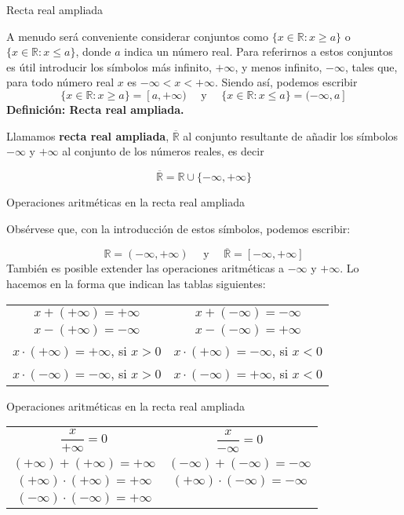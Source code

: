\documentclass[ignorenonframetext,]{beamer}
\begin{document}
\begin{frame}{Recta real ampliada}
\protect\hypertarget{recta-real-ampliada}{}

A menudo será conveniente considerar conjuntos como
\(\{ x \in \mathbb{R}: x \geq a \}\) o
\(\{x \in \mathbb{R}: x \leq a \}\), donde \(a\) indica un número real.
Para referirnos a estos conjuntos es útil introducir los símbolos más
infinito, \(+ \infty\), y menos infinito, \(- \infty\), tales que, para
todo número real \(x\) es \(-\infty < x < +\infty\). Siendo así, podemos
escribir \[
\{ x \in \mathbb{R}: x \geq a \} = [a,+\infty) \quad  \text{ y } \quad \{ x \in \mathbb{R}: x \leq a \} = (-\infty,a]
\] \textbf{Definición: Recta real ampliada.}

Llamamos \textbf{recta real ampliada}, \(\overline{\mathbb{R}}\) al
conjunto resultante de añadir los símbolos \(-\infty\) y \(+\infty\) al
conjunto de los números reales, es decir

\[
\overline{\mathbb{R}} = \mathbb{R} \cup \{ -\infty,+\infty \}
\]

\end{frame}

\begin{frame}{Operaciones aritméticas en la recta real ampliada}
\protect\hypertarget{operaciones-aritmuxe9ticas-en-la-recta-real-ampliada}{}

Obsérvese que, con la introducción de estos símbolos, podemos escribir:

\[
\mathbb{R}=(-\infty,+\infty) \quad \text{ y } \quad \overline{\mathbb{R}} = [-\infty,+\infty]
\] También es posible extender las operaciones aritméticas a
\(- \infty\) y \(+\infty\). Lo hacemos en la forma que indican las
tablas siguientes:

\begin{longtable}[]{@{}cc@{}}
\toprule
\endhead
\(x+(+\infty) = +\infty\) & \(x+(-\infty) = -\infty\)\tabularnewline
\(x-(+\infty) = -\infty\) & \(x-(-\infty) = +\infty\)\tabularnewline
\(x \cdot (+\infty) = +\infty\), si \(x>0\) &
\(x \cdot (+\infty) = -\infty\), si \(x<0\)\tabularnewline
\(x \cdot (-\infty) = -\infty\), si \(x>0\) &
\(x \cdot (-\infty) = +\infty\), si \(x<0\)\tabularnewline
\bottomrule
\end{longtable}

\end{frame}

\begin{frame}{Operaciones aritméticas en la recta real ampliada}
\protect\hypertarget{operaciones-aritmuxe9ticas-en-la-recta-real-ampliada-1}{}

\begin{longtable}[]{@{}cc@{}}
\toprule
\endhead
\(\dfrac{x}{+\infty} =0\) & \(\dfrac{x}{-\infty} =0\)\tabularnewline
\((+\infty) + (+\infty) = +\infty\) &
\((-\infty) + (-\infty)= -\infty\)\tabularnewline
\((+\infty) \cdot (+\infty) = +\infty\) &
\((+\infty) \cdot (-\infty) = -\infty\)\tabularnewline
\((-\infty) \cdot (-\infty) = +\infty\) &\tabularnewline
\bottomrule
\end{longtable}

\end{frame}
\end{document}
